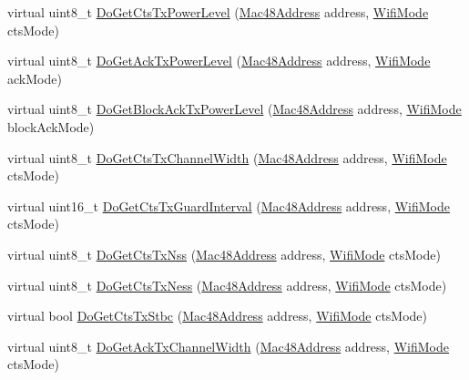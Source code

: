 \begin{DoxyCompactItemize}
\item 
virtual uint8\+\_\+t \hyperlink{classns3_1_1WifiRemoteStationManager_ab6f6d33aee0d1df5df81951d0318e807}{Do\+Get\+Cts\+Tx\+Power\+Level} (\hyperlink{classns3_1_1Mac48Address}{Mac48\+Address} address, \hyperlink{classns3_1_1WifiMode}{Wifi\+Mode} cts\+Mode)
\item 
virtual uint8\+\_\+t \hyperlink{classns3_1_1WifiRemoteStationManager_a36b5713934e66f078766b3c67a4315ca}{Do\+Get\+Ack\+Tx\+Power\+Level} (\hyperlink{classns3_1_1Mac48Address}{Mac48\+Address} address, \hyperlink{classns3_1_1WifiMode}{Wifi\+Mode} ack\+Mode)
\item 
virtual uint8\+\_\+t \hyperlink{classns3_1_1WifiRemoteStationManager_a8f12162f42dd03ef4c0fb00f75ff4a9d}{Do\+Get\+Block\+Ack\+Tx\+Power\+Level} (\hyperlink{classns3_1_1Mac48Address}{Mac48\+Address} address, \hyperlink{classns3_1_1WifiMode}{Wifi\+Mode} block\+Ack\+Mode)
\item 
virtual uint8\+\_\+t \hyperlink{classns3_1_1WifiRemoteStationManager_ae77df00c5cbe134e3b1a43c7d348e767}{Do\+Get\+Cts\+Tx\+Channel\+Width} (\hyperlink{classns3_1_1Mac48Address}{Mac48\+Address} address, \hyperlink{classns3_1_1WifiMode}{Wifi\+Mode} cts\+Mode)
\item 
virtual uint16\+\_\+t \hyperlink{classns3_1_1WifiRemoteStationManager_aa7fc0860a5b2ecb249aa3e2d9bb8510e}{Do\+Get\+Cts\+Tx\+Guard\+Interval} (\hyperlink{classns3_1_1Mac48Address}{Mac48\+Address} address, \hyperlink{classns3_1_1WifiMode}{Wifi\+Mode} cts\+Mode)
\item 
virtual uint8\+\_\+t \hyperlink{classns3_1_1WifiRemoteStationManager_a982cc0fea805c805755ea31e14572b7d}{Do\+Get\+Cts\+Tx\+Nss} (\hyperlink{classns3_1_1Mac48Address}{Mac48\+Address} address, \hyperlink{classns3_1_1WifiMode}{Wifi\+Mode} cts\+Mode)
\item 
virtual uint8\+\_\+t \hyperlink{classns3_1_1WifiRemoteStationManager_a9261e3b4ad68a53ebd36335c6a5701fb}{Do\+Get\+Cts\+Tx\+Ness} (\hyperlink{classns3_1_1Mac48Address}{Mac48\+Address} address, \hyperlink{classns3_1_1WifiMode}{Wifi\+Mode} cts\+Mode)
\item 
virtual bool \hyperlink{classns3_1_1WifiRemoteStationManager_a91ed8ab5ff93e3f900ba76fd7b1ed56c}{Do\+Get\+Cts\+Tx\+Stbc} (\hyperlink{classns3_1_1Mac48Address}{Mac48\+Address} address, \hyperlink{classns3_1_1WifiMode}{Wifi\+Mode} cts\+Mode)
\item 
virtual uint8\+\_\+t \hyperlink{classns3_1_1WifiRemoteStationManager_ab5639912a1a37b80b669a6f4871c782b}{Do\+Get\+Ack\+Tx\+Channel\+Width} (\hyperlink{classns3_1_1Mac48Address}{Mac48\+Address} address, \hyperlink{classns3_1_1WifiMode}{Wifi\+Mode} cts\+Mode)

\end{DoxyCompactItemize}

